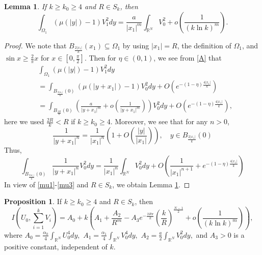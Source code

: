 \documentclass{amsart}
\newtheorem{lemma}[theorem]{Lemma}
\theoremstyle{definition}
\newtheorem{proposition}[theorem]{Proposition}
\theoremstyle{remark}
\numberwithin{equation}{section}
\begin{document}
 \begin{lemma}\label{lemma_mu}If  $k\ge k_0\ge 4$ and $R \in S_k$, then \[\int_{\Omega_{1}}(\mu(|y|)-1) V_1^{2}dy=\frac{a}{\left|x_{1}\right|^{m}}\int_{\mathbb{R}^N}V_0^2+o\left(\frac{1}{(k\ln k)^m}\right).\]  \end{lemma}
\begin{proof}We  note that $B_{\frac{2|x_1|}{k}}(x_1)\subseteq\Omega_1$  by using $|x_1|=R$, the definition of $\Omega_1$, and  $\sin x\ge \frac{2}{\pi}x$ for $x\in [0,\frac{\pi}{2}]$.
Then for $\eta\in(0,1)$,  we see from \eqref{A} that
\begin{equation}
\begin{aligned}\label{mu1}
&\int_{\Omega_1}\left(\mu\left(\left|y\right|\right)-1\right) V_1^{2}dy\\&=\int_{B_{\frac{2|x_1|}{k}}(0)}\left(\mu\left(\left|y+x_{1}\right|\right)-1\right) V_0^{2}dy+O\left(e^{-(1-\eta)\frac{4|x_1|}{k}}\right) \\
&=\int_{B_{\frac{2R}{k}}(0)}\left(\frac{a}{\left|y+x_{1}\right|^{m}}+o\left(\frac{1}{\left|y+x_{1}\right|^{m}}\right)\right) V_0^{2}dy+O\left(e^{-(1-\eta)\frac{4|x_1|}{k}}\right),
\end{aligned}
\end{equation}
here we used $\frac{2R}{k}<R$ if $k\ge k_0\ge 4$. Moreover, we see that for any $n>0$,
\begin{equation}\label{mu2}
\frac{1}{\left|y+x_{1}\right|^{{n}}}=\frac{1}{\left|x_{1}\right|^{{n}}}\left(1+O\left(\frac{|y|}{\left|x_{1}\right|}\right)\right), \quad y \in B_{\frac{2|x_1|}{k}}(0)
\end{equation}
Thus,
\begin{equation}\label{mu3}
\int_{B_{\frac{2|x_1|}{k}}(0)} \frac{1}{\left|y+x_{1}\right|^{{n}}} V_0^{2}dy=\frac{1}{\left|x_{1}\right|^{{n}}} \int_{\mathbb{R}^{N}} V_0^{2}dy+O\left(\frac{1}{\left|x_{1}\right|^{{n}+1}}+e^{-(1-\eta)\frac{4|x_1|}{k}}\right)
\end{equation}In view of \eqref{mu1}-\eqref{mu3} and $R\in S_k$, we obtain Lemma \ref{lemma_mu}.
\end{proof}
\begin{proposition}\label{A.3}If  $k\ge k_0\ge 4$ and $R \in S_k$, then 
\begin{equation*}
I\left(U_0, \sum_{i=1}^k V_{i}\right)=A_0+k\left(A_1+\frac{A_2}{R^{m}}-A_3 e^{-\frac{2R\pi}{k}}\left(\frac{k}{R}\right)^{\frac{N-1}{2}}+o\left(\frac{1}{(k\ln k)^{m}}\right)\right),
\end{equation*}
where   $A_0=\frac{\alpha_0}{4} \int_{\mathbb{R}^{N}} U_0^{4}dy,$ $
A_1=\frac{\alpha_1}{4} \int_{\mathbb{R}^{N}} V_0^{4}dy,$   $A_2=\frac{a}{2} \int_{\mathbb{R}^{N}} V_0^{2}dy,$ and $A_{3}>0$ is a positive constant, independent of $k$.\end{proposition}
\end{document}
